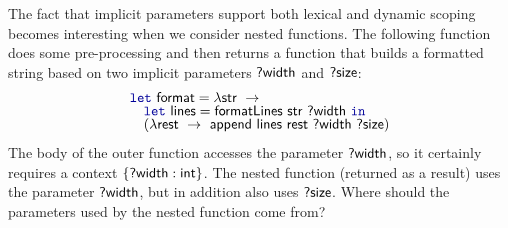 The fact that implicit parameters support both lexical and dynamic scoping becomes interesting
when we consider nested functions. The following function does some pre-processing and then returns a 
function that builds a formatted string based on two implicit parameters $\textnormal{\sffamily ?width}$ and 
$\textnormal{\sffamily ?size}$:
%
\begin{equation*}
\begin{array}{l}
\kvd{let}~\ident{format} = \lambda \ident{str}~\rightarrow \\[-0.25em]
\quad \kvd{let}~\ident{lines} = \ident{formatLines}~\ident{str}~\ident{?width}~\kvd{in}\\[-0.25em]
\quad (\lambda \ident{rest}~\rightarrow~\ident{append}~
         \ident{lines}~\ident{rest}~\ident{?width}~\ident{?size})
\end{array}
\end{equation*}
%
The body of the outer function accesses the parameter $\textnormal{\sffamily ?width}$, so it certainly requires a context 
$\{ \textnormal{\sffamily ?width} : \textnormal{\sffamily int} \}$. The nested function (returned as a result) uses the parameter 
$\textnormal{\sffamily ?width}$, but in addition also uses $\textnormal{\sffamily ?size}$. Where should the parameters used by the 
nested function come from?

